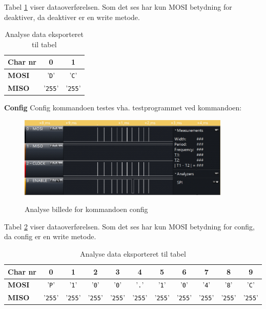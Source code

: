 Tabel \ref{table:scop_deactivate} viser dataoverførelsen. Som det ses har kun MOSI betydning for deaktiver, da deaktiver er en write metode. 

\begin{table}[h]
	\caption{Analyse data eksporteret til tabel}
	\centering
	\begin{tabular}{|l|c|c|}
		\hline 
		\textbf{Char nr} & \textbf{0} & \textbf{1} \\ 		
		\hline 
		\textbf{MOSI} & '\verb+D+' & '\verb+C+' \\ 
		\hline 
		\textbf{MISO} & '\verb+255+' & '\verb+255+' \\ 
		\hline 
	\end{tabular} 
	\label{table:scop_deactivate}
\end{table}


\textbf{Config}
Config kommandoen testes vha. testprogrammet ved kommandoen: 


\begin{figure}[H]
\centering
{\includegraphics[width=0.90\textwidth]{filer/modultest/Billeder/config}}
\caption{Analyse billede for kommandoen config}
\label{lab:scop_config}
\end{figure}

Tabel \ref{table:scop_config} viser dataoverførelsen. Som det ses har kun MOSI betydning for config, da config er en write metode. 

\begin{table}[H]
	\caption{Analyse data eksporteret til tabel}
	\centering
	\begin{tabular}{|l|c|c|c|c|c|c|c|c|c|c|}
		\hline 
		\textbf{Char nr} & \textbf{0} & \textbf{1} & \textbf{2} & \textbf{3} & \textbf{4} & \textbf{5} 
						 & \textbf{6} & \textbf{7} & \textbf{8} & \textbf{9}\\ 		
		\hline 
		\textbf{MOSI} & '\verb+P+' & '\verb+1+' & '\verb+0+' & '\verb+0+' & '\verb+.+' & '\verb+1+' 
						& '\verb+0+' & '\verb+4+' & '\verb+8+' & '\verb+C+' \\ 
		\hline 
		\textbf{MISO} & '\verb+255+' & '\verb+255+' & '\verb+255+' & '\verb+255+' & '\verb+255+' & '\verb+255+' 
						& '\verb+255+' & '\verb+255+' & '\verb+255+' & '\verb+255+' \\ 
		\hline 
	\end{tabular} 
	\label{table:scop_config}
\end{table}


